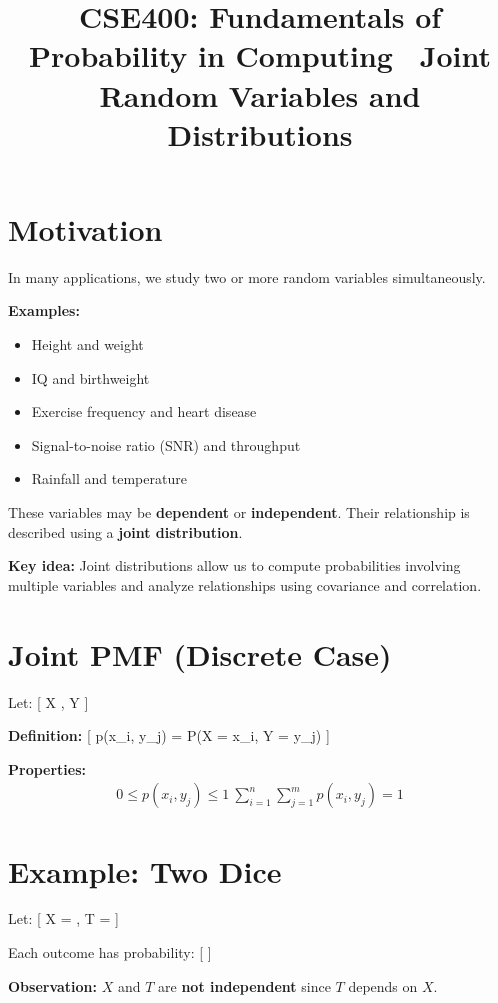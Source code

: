 \documentclass[12pt]{article}
\title{CSE400: Fundamentals of Probability in Computing \ Joint Random Variables and Distributions}
\author{}
\date{}
\begin{document}
\maketitle

\section{Motivation}

In many applications, we study two or more random variables simultaneously.

\textbf{Examples:}
\begin{itemize}
\item Height and weight
\item IQ and birthweight
\item Exercise frequency and heart disease
\item Signal-to-noise ratio (SNR) and throughput
\item Rainfall and temperature
\end{itemize}

These variables may be \textbf{dependent} or \textbf{independent}. Their relationship is described using a \textbf{joint distribution}.

\textbf{Key idea:} Joint distributions allow us to compute probabilities involving multiple variables and analyze relationships using covariance and correlation.

\section{Joint PMF (Discrete Case)}

Let:
[
X , \quad Y 
]

\textbf{Definition:}
[
p(x_i, y_j) = P(X = x_i, Y = y_j)
]

\textbf{Properties:}
\begin{align*}
0 \le p(x_i, y_j) \le 1 \
\sum_{i=1}^{n} \sum_{j=1}^{m} p(x_i, y_j) = 1
\end{align*}

\section{Example: Two Dice}

Let:
[
X = , \quad T = 
]

Each outcome has probability:
[
]

\textbf{Observation:} $X$ and $T$ are \textbf{not independent} since $T$ depends on $X$.
\end{document}

